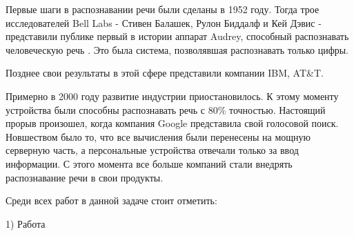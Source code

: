 Первые шаги в распознавании речи были сделаны в 1952 году. Тогда трое исследователей Bell Labs - Стивен Балашек, Рулон Биддалф и Кей Дэвис - представили публике первый в истории аппарат Audrey, способный распознавать человеческую речь \cite{Audrey}. Это была система, позволявшая распознавать только цифры. 

Позднее свои результаты в этой сфере представили компании IBM, AT\&T.


Примерно в 2000 году развитие индустрии приостановилось. К этому моменту устройства были способны распознавать речь с 80\% точностью. Настоящий прорыв произошел, когда компания Google представила свой голосовой поиск. Новшеством было то, что все вычисления были перенесены на мощную серверную часть, а персональные устройства отвечали только за ввод информации. С этого момента все больше компаний стали внедрять распознавание речи в свои продукты.

Среди всех работ в данной задаче стоит отметить:

1) Работа 